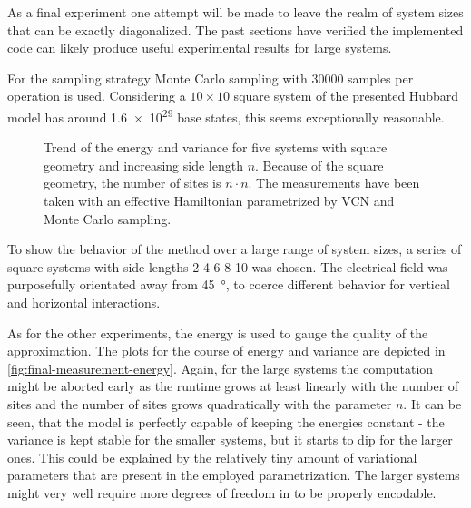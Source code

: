 As a final experiment one attempt will be made to leave the realm of system sizes that can be exactly diagonalized.
The past sections have verified the implemented code can likely produce useful experimental results for large systems.

For the sampling strategy Monte Carlo sampling with \num{30000} samples per operation is used.
Considering a $10\times{}10$ square system of the presented Hubbard model has around \num{1.6e29} base states, this seems exceptionally reasonable.

\begin{figure}[htbp]
    \centering
    \vspace{-0.3cm}
    \caption{
            Trend of the energy and variance for five systems with square geometry and increasing side length $n$.
            Because of the square geometry, the number of sites is $n\cdot n $.
            The measurements have been taken with an effective Hamiltonian parametrized by VCN and Monte Carlo sampling.
        }
    \label{fig:final-measurement-energy}
\end{figure}

To show the behavior of the method over a large range of system sizes, a series of square systems with side lengths 2-4-6-8-10 was chosen.
The electrical field was purposefully orientated away from \SI{45}{\degree}, to coerce different behavior for vertical and horizontal interactions.

As for the other experiments, the energy is used to gauge the quality of the approximation. 
The plots for the course of energy and variance are depicted in \autoref{fig:final-measurement-energy}.
Again, for the large systems the computation might be aborted early as the runtime grows at least linearly with the number of sites and the number of sites grows quadratically with the parameter $n$.
It can be seen, that the model is perfectly capable of keeping the energies constant - the variance is kept stable for the smaller systems, but it starts to dip for the larger ones.
This could be explained by the relatively tiny amount of variational parameters that are present in the employed parametrization.
The larger systems might very well require more degrees of freedom in \Hvcn{\vec{\eta}} to be properly encodable.

